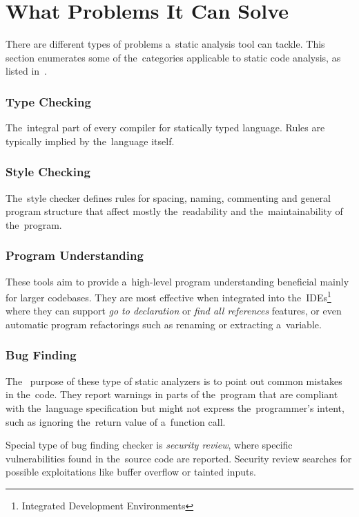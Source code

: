\documentclass[
  digital, %
  table,   %
  lof,     %
  lot,     %
  oneside,
]{fithesis3}
\begin{document}
\section{What Problems It Can Solve}
There are different types of problems a~static analysis tool can tackle. This section enumerates some of the~categories applicable to static code analysis, as listed in~\cite{secure-programming-with-sca}.

\subsubsection{\textbf{Type Checking}}
The~integral part of every compiler for statically typed language. Rules are typically implied by the~language itself.

\subsubsection{\textbf{Style Checking}}
The~style checker defines rules for spacing, naming, commenting and general program structure that affect mostly the~readability and the~maintainability of the~program. 

\subsubsection{\textbf{Program Understanding}}
These tools aim to provide a~high-level program understanding beneficial mainly for larger codebases. They are most effective when integrated into the~IDEs\footnote{Integrated Development Environments} where they can support \textit{go to declaration} or \textit{find all references} features, or even automatic program refactorings such as renaming or extracting a~variable.

\subsubsection{\textbf{Bug Finding}}
The~ purpose of these type of static analyzers is to point out common mistakes in the~code. They report warnings in parts of the~program that are compliant with the~language specification but might not express the~programmer's intent, such as ignoring the~return value of a~function call.

Special type of bug finding checker is \textit{security review}, where specific vulnerabilities found in the~source code are reported. Security review searches for possible exploitations like buffer overflow or tainted inputs.
  
\end{document}
